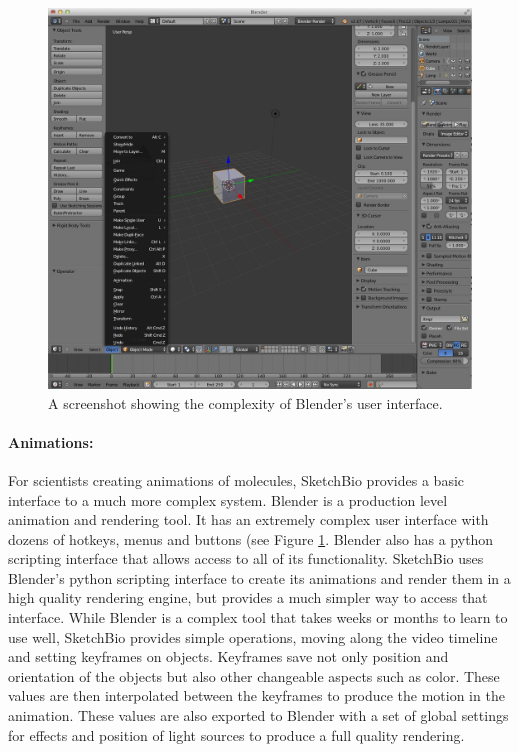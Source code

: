 \documentclass[twocolumn]{bmcart}%
\begin{document}
\begin{figure}[h]
\centering
\includegraphics[width=0.9\columnwidth]{blender_interface.png}
\caption{A screenshot showing the complexity of Blender's user interface.}
\label{fig:blender_interface}
\end{figure}

\paragraph*{Animations:}
For scientists creating animations of molecules, SketchBio provides a basic interface to a much more complex system.  Blender is a production level animation and rendering tool.  It has an extremely complex user interface with dozens of hotkeys, menus and buttons (see Figure \ref{fig:blender_interface}.  Blender also has a python scripting interface that allows access to all of its functionality.  SketchBio uses Blender's python scripting interface to create its animations and render them in a high quality rendering engine, but provides a much simpler way to access that interface.  While Blender is a complex tool that takes weeks or months to learn to use well, SketchBio provides simple operations, moving along the video timeline and setting keyframes on objects.  Keyframes save not only position and orientation of the objects but also other changeable aspects such as color.  These values are then interpolated between the keyframes to produce the motion in the animation.  These values are also exported to Blender with a set of global settings for effects and position of light sources to produce a full quality rendering.
\end{document}
